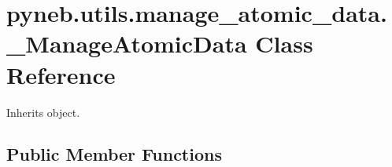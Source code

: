 \hypertarget{classpyneb_1_1utils_1_1manage__atomic__data_1_1___manage_atomic_data}{\section{pyneb.\-utils.\-manage\-\_\-atomic\-\_\-data.\-\_\-\-Manage\-Atomic\-Data Class Reference}
\label{classpyneb_1_1utils_1_1manage__atomic__data_1_1___manage_atomic_data}
}


Inherits object.

\subsection*{Public Member Functions}
